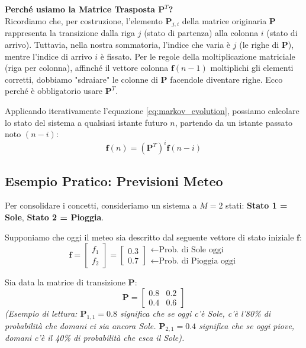 \textbf{Perché usiamo la Matrice Trasposta $\mathbf{P}^T$?} \\
Ricordiamo che, per costruzione, l'elemento $\mathbf{P}_{j,i}$ della matrice originaria $\mathbf{P}$ rappresenta la transizione dalla riga $j$ (stato di partenza) alla colonna $i$ (stato di arrivo). 
Tuttavia, nella nostra sommatoria, l'indice che varia è $j$ (le righe di $\mathbf{P}$), mentre l'indice di arrivo $i$ è fissato. Per le regole della moltiplicazione matriciale (riga per colonna), affinché il vettore colonna $\mathbf{f}(n-1)$ moltiplichi gli elementi corretti, dobbiamo "sdraiare" le colonne di $\mathbf{P}$ facendole diventare righe. Ecco perché è obbligatorio usare $\mathbf{P}^T$.

Applicando iterativamente l'equazione \ref{eq:markov_evolution}, possiamo calcolare lo stato del sistema a qualsiasi istante futuro $n$, partendo da un istante passato noto $(n-i)$:
\begin{equation}
    \mathbf{f}(n) = (\mathbf{P}^T)^i \mathbf{f}(n-i)
\end{equation}

\subsection{Esempio Pratico: Previsioni Meteo}

Per consolidare i concetti, consideriamo un sistema a $M=2$ stati: \textbf{Stato 1 = Sole}, \textbf{Stato 2 = Pioggia}.

Supponiamo che oggi il meteo sia descritto dal seguente vettore di stato iniziale $\mathbf{f}$:
\begin{equation*}
    \mathbf{f} = \begin{bmatrix} f_1 \\ f_2 \end{bmatrix} = \begin{bmatrix} 0.3 \\ 0.7 \end{bmatrix} \begin{array}{l} \leftarrow \text{Prob. di Sole oggi} \\ \leftarrow \text{Prob. di Pioggia oggi} \end{array}
\end{equation*}

Sia data la matrice di transizione $\mathbf{P}$:
\begin{equation*}
    \mathbf{P} = \begin{bmatrix} 0.8 & 0.2 \\ 0.4 & 0.6 \end{bmatrix}
\end{equation*}
\textit{(Esempio di lettura: $\mathbf{P}_{1,1}=0.8$ significa che se oggi c'è Sole, c'è l'80\% di probabilità che domani ci sia ancora Sole. $\mathbf{P}_{2,1}=0.4$ significa che se oggi piove, domani c'è il 40\% di probabilità che esca il Sole).}

